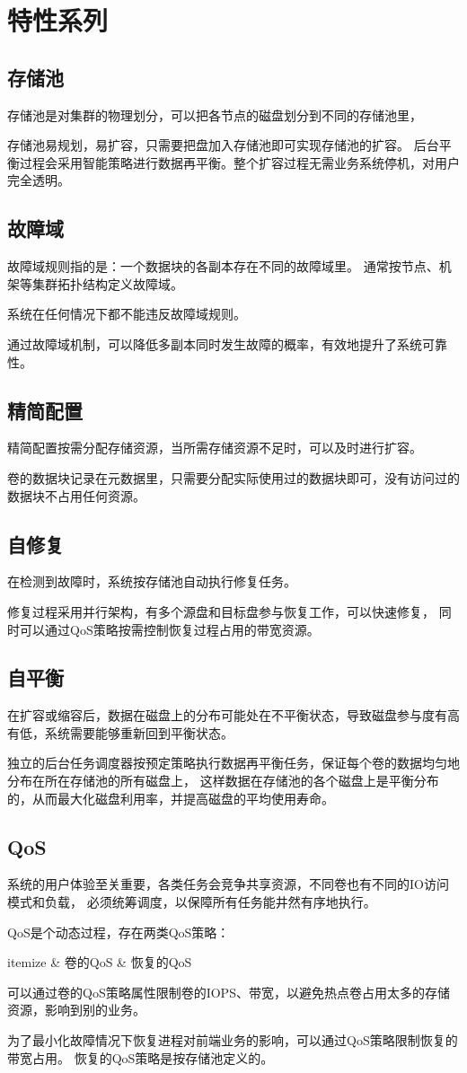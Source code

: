 \chapter{特性系列}

\section{存储池}

存储池是对集群的物理划分，可以把各节点的磁盘划分到不同的存储池里，

存储池易规划，易扩容，只需要把盘加入存储池即可实现存储池的扩容。
后台平衡过程会采用智能策略进行数据再平衡。整个扩容过程无需业务系统停机，对用户完全透明。

\section{故障域}

故障域规则指的是：一个数据块的各副本存在不同的故障域里。
通常按节点、机架等集群拓扑结构定义故障域。

系统在任何情况下都不能违反故障域规则。

通过故障域机制，可以降低多副本同时发生故障的概率，有效地提升了系统可靠性。

\section{精简配置}

精简配置按需分配存储资源，当所需存储资源不足时，可以及时进行扩容。

卷的数据块记录在元数据里，只需要分配实际使用过的数据块即可，没有访问过的数据块不占用任何资源。

\section{自修复}

在检测到故障时，系统按存储池自动执行修复任务。

修复过程采用并行架构，有多个源盘和目标盘参与恢复工作，可以快速修复，
同时可以通过QoS策略按需控制恢复过程占用的带宽资源。

\section{自平衡}

在扩容或缩容后，数据在磁盘上的分布可能处在不平衡状态，导致磁盘参与度有高有低，系统需要能够重新回到平衡状态。

独立的后台任务调度器按预定策略执行数据再平衡任务，保证每个卷的数据均匀地分布在所在存储池的所有磁盘上，
这样数据在存储池的各个磁盘上是平衡分布的，从而最大化磁盘利用率，并提高磁盘的平均使用寿命。

\section{QoS}

系统的用户体验至关重要，各类任务会竞争共享资源，不同卷也有不同的IO访问模式和负载，
必须统筹调度，以保障所有任务能井然有序地执行。

QoS是个动态过程，存在两类QoS策略：
\begin{myeasylist}{itemize}
& 卷的QoS
& 恢复的QoS
\end{myeasylist}

可以通过卷的QoS策略属性限制卷的IOPS、带宽，以避免热点卷占用太多的存储资源，影响到别的业务。

为了最小化故障情况下恢复进程对前端业务的影响，可以通过QoS策略限制恢复的带宽占用。
恢复的QoS策略是按存储池定义的。
